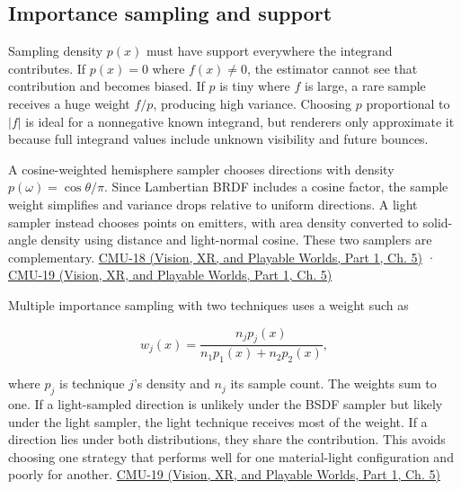 \subsection{Importance sampling and support}\label{03-visual-computing-i-ch012-importance-sampling-and-support}

\hypertarget{03-visual-computing-i-ch012-importance-sampling-and-support}{}

Sampling density \(p(x)\) must have support everywhere the integrand contributes. If \(p(x)=0\) where \(f(x)\ne0\), the estimator cannot see that contribution and becomes biased. If \(p\) is tiny where \(f\) is large, a rare sample receives a huge weight \(f/p\), producing high variance. Choosing \(p\) proportional to \(|f|\) is ideal for a nonnegative known integrand, but renderers only approximate it because full integrand values include unknown visibility and future bounces.

A cosine-weighted hemisphere sampler chooses directions with density \(p(\omega)=\cos\theta/\pi\). Since Lambertian BRDF includes a cosine factor, the sample weight simplifies and variance drops relative to uniform directions. A light sampler instead chooses points on emitters, with area density converted to solid-angle density using distance and light-normal cosine. These two samplers are complementary. \href{../07-Vision-XR-and-Playable-Worlds-P01/main.pdf\#nameddest=04-visual-computing-ii-ch036-cmu-18---monte-carlo-rendering}{CMU-18 (Vision, XR, and Playable Worlds, Part 1, Ch. 5)} · \href{../07-Vision-XR-and-Playable-Worlds-P01/main.pdf\#nameddest=04-visual-computing-ii-ch036-cmu-19---variance-reduction}{CMU-19 (Vision, XR, and Playable Worlds, Part 1, Ch. 5)}

Multiple importance sampling with two techniques uses a weight such as

\[
w_j(x)=\frac{n_jp_j(x)}{n_1p_1(x)+n_2p_2(x)},
\]

where \(p_j\) is technique \(j\)'s density and \(n_j\) its sample count. The weights sum to one. If a light-sampled direction is unlikely under the BSDF sampler but likely under the light sampler, the light technique receives most of the weight. If a direction lies under both distributions, they share the contribution. This avoids choosing one strategy that performs well for one material-light configuration and poorly for another. \href{../07-Vision-XR-and-Playable-Worlds-P01/main.pdf\#nameddest=04-visual-computing-ii-ch036-cmu-19---variance-reduction}{CMU-19 (Vision, XR, and Playable Worlds, Part 1, Ch. 5)}

